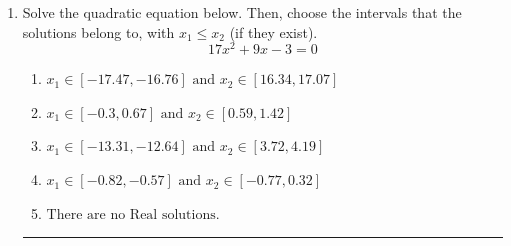 \documentclass[14pt]{extbook}
\newcommand{\litem}[1]{\item#1\hspace*{-1cm}\rule{\textwidth}{0.4pt}}
\begin{document}
\begin{enumerate}
{\begin{enumerate}[label=\Alph*.]
\end{enumerate} }
\litem{
Solve the quadratic equation below. Then, choose the intervals that the solutions belong to, with $x_1 \leq x_2$ (if they exist).\[ 17x^{2} +9 x -3 = 0 \]\begin{enumerate}[label=\Alph*.]
\item \( x_1 \in [-17.47, -16.76] \text{ and } x_2 \in [16.34, 17.07] \)
\item \( x_1 \in [-0.3, 0.67] \text{ and } x_2 \in [0.59, 1.42] \)
\item \( x_1 \in [-13.31, -12.64] \text{ and } x_2 \in [3.72, 4.19] \)
\item \( x_1 \in [-0.82, -0.57] \text{ and } x_2 \in [-0.77, 0.32] \)
\item \( \text{There are no Real solutions.} \)

\end{enumerate} }
\end{enumerate}
\end{document}

